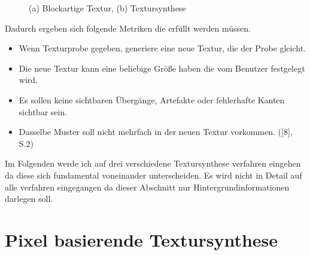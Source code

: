 \documentclass[12pt]{report}
\begin{document}
\begin{figure}[H]
    \centering
    \qquad
    \caption{(a) Blockartige Textur, (b) Textursynthese}%
\end{figure}

\noindent Dadurch ergeben sich folgende Metriken die erfüllt werden müssen.

\begin{itemize}
    \item Wenn Texturprobe gegeben, generiere eine neue Textur, die der Probe gleicht.
    \item Die neue Textur kann eine beliebige Größe haben die vom Benutzer festgelegt wird.
    \item Es sollen keine sichtbaren Übergänge, Artefakte oder fehlerhafte Kanten sichtbar sein.
    \item Dasselbe Muster soll nicht mehrfach in der neuen Textur vorkommen. {([8], S.2)}
\end{itemize}

Im Folgenden werde ich auf drei verschiedene Textursynthese verfahren eingehen da diese sich fundamental voneinander unterscheiden.
Es wird nicht in Detail auf alle verfahren eingegangen da dieser Abschnitt nur Hintergrundinformationen darlegen soll.

\section{Pixel basierende Textursynthese}
\end{document}
